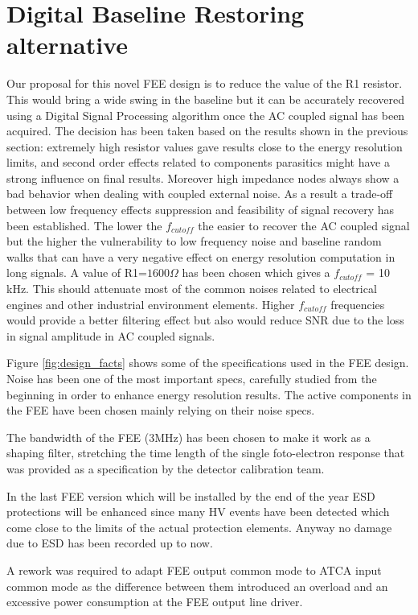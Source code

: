 \documentclass[a4paper,11pt]{report}
\begin{document}
\section{Digital Baseline Restoring alternative}
Our proposal for this novel FEE design is to reduce the value of the R1 resistor. This would bring a wide swing in the baseline but it can be accurately recovered using a Digital Signal Processing algorithm once the AC coupled signal has been acquired. The decision has been taken based on the results shown in the previous section: extremely high resistor values gave results close to the energy resolution limits, and second order effects related to components parasitics might have a strong influence on final results. Moreover high impedance nodes always show a bad behavior when dealing with coupled external noise. As a result a trade-off between low frequency effects suppression and feasibility of signal recovery has been established. The lower the $f_{cutoff}$ the easier to recover the AC coupled signal but the higher the vulnerability to low frequency noise and baseline random walks that can have a very negative effect on energy resolution computation in long signals. A value of R1=$1600\Omega$ has been chosen which gives a $f_{cutoff}$ = 10 kHz. This should attenuate most of the common noises related to electrical engines and other industrial environment elements. Higher $f_{cutoff}$ frequencies would provide a better filtering effect but also would reduce SNR due to the loss in signal amplitude in AC coupled signals.
\par Figure \ref{fig:design_facts} shows some of the specifications used in the FEE design. Noise has been one of the most important specs, carefully studied from the beginning in order to enhance energy resolution results. The active components in the FEE have been chosen mainly relying on their noise specs. 
\par The bandwidth of the FEE (3MHz) has been chosen to make it work as a shaping filter, stretching the time length of the single foto-electron response that was provided as a specification by the detector calibration team.

\par In the last FEE version which will be installed by the end of the year ESD protections will be enhanced since many HV events have been detected which come close to the limits of the actual protection elements. Anyway no damage due to ESD has been recorded up to now. 

\par A rework was required to adapt FEE output common mode to ATCA input common mode as the difference between them introduced an overload and an excessive power consumption at the FEE output line driver. 
\end{document}
